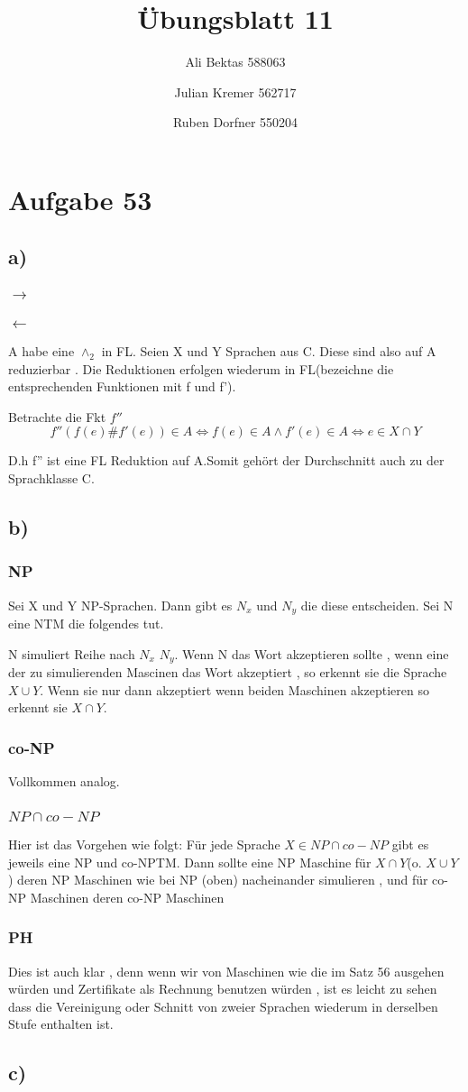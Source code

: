 \documentclass{article}
\title{Übungsblatt 11}
\author{Ali Bektas 588063 \and Julian Kremer 562717 \and Ruben Dorfner 550204}
\begin{document}
	\maketitle

	\section*{Aufgabe 53}

		\subsection*{a)}
			\subsubsection{$\rightarrow$}
				
			\subsubsection{$\leftarrow$}
				A habe eine $\land_2$ in FL.
				Seien X und Y Sprachen aus C. Diese sind also auf A reduzierbar . Die Reduktionen erfolgen wiederum in FL(bezeichne die entsprechenden Funktionen mit f und f').

 				Betrachte die Fkt $f''$
				\[
					f''(f(e)\#f'(e)) \in A \iff f(e) \in A \land f'(e) \in A \iff e \in X \cap Y
				\]

				D.h f'' ist eine FL Reduktion auf A.Somit gehört der Durchschnitt auch zu der Sprachklasse C.

		\subsection*{b)}
			\subsubsection*{NP}
				Sei X und Y NP-Sprachen. Dann gibt es $N_x$ und $N_y$ die diese entscheiden. Sei N eine NTM die folgendes tut. 

				N simuliert Reihe nach $N_x$ $N_y$. Wenn N das Wort akzeptieren sollte , wenn eine der zu simulierenden Mascinen das Wort akzeptiert , so erkennt sie die Sprache $X \cup Y$. Wenn sie nur dann akzeptiert wenn beiden Maschinen akzeptieren so erkennt sie $X \cap Y$.
			\subsubsection*{co-NP}
				Vollkommen analog.
			\subsubsection*{$NP \cap co-NP$}
				Hier ist das Vorgehen wie folgt: Für jede Sprache $X\in NP \cap co-NP$ gibt es jeweils eine NP und co-NPTM. Dann sollte eine NP Maschine für $X\cap Y$(o. $ X \cup Y$) deren NP Maschinen wie bei NP (oben) nacheinander simulieren , und für co-NP Maschinen deren co-NP Maschinen 
			\subsubsection*{PH}
				Dies ist auch klar , denn wenn wir von Maschinen wie die im Satz 56 ausgehen würden und Zertifikate als Rechnung benutzen würden , ist es leicht zu sehen dass die Vereinigung oder Schnitt von zweier Sprachen wiederum in derselben Stufe enthalten ist. 
		\subsection*{c)}
\end{document}

